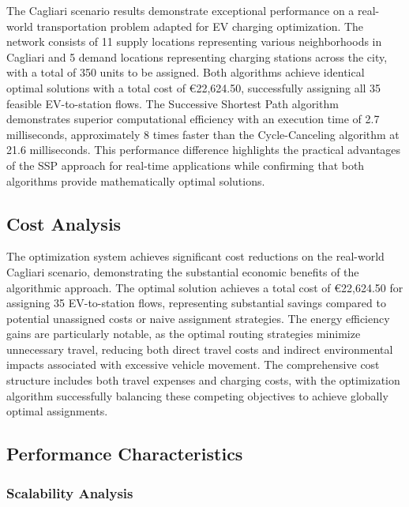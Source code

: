 \documentclass[12pt,a4paper]{article}
\begin{document}
The Cagliari scenario results demonstrate exceptional performance on a real-world transportation problem adapted for EV charging optimization. The network consists of 11 supply locations representing various neighborhoods in Cagliari and 5 demand locations representing charging stations across the city, with a total of 350 units to be assigned. Both algorithms achieve identical optimal solutions with a total cost of €22,624.50, successfully assigning all 35 feasible EV-to-station flows. The Successive Shortest Path algorithm demonstrates superior computational efficiency with an execution time of 2.7 milliseconds, approximately 8 times faster than the Cycle-Canceling algorithm at 21.6 milliseconds. This performance difference highlights the practical advantages of the SSP approach for real-time applications while confirming that both algorithms provide mathematically optimal solutions.

\subsection{Cost Analysis}

The optimization system achieves significant cost reductions on the real-world Cagliari scenario, demonstrating the substantial economic benefits of the algorithmic approach. The optimal solution achieves a total cost of €22,624.50 for assigning 35 EV-to-station flows, representing substantial savings compared to potential unassigned costs or naive assignment strategies. The energy efficiency gains are particularly notable, as the optimal routing strategies minimize unnecessary travel, reducing both direct travel costs and indirect environmental impacts associated with excessive vehicle movement. The comprehensive cost structure includes both travel expenses and charging costs, with the optimization algorithm successfully balancing these competing objectives to achieve globally optimal assignments.

\subsection{Performance Characteristics}

\subsubsection{Scalability Analysis}
\end{document}
